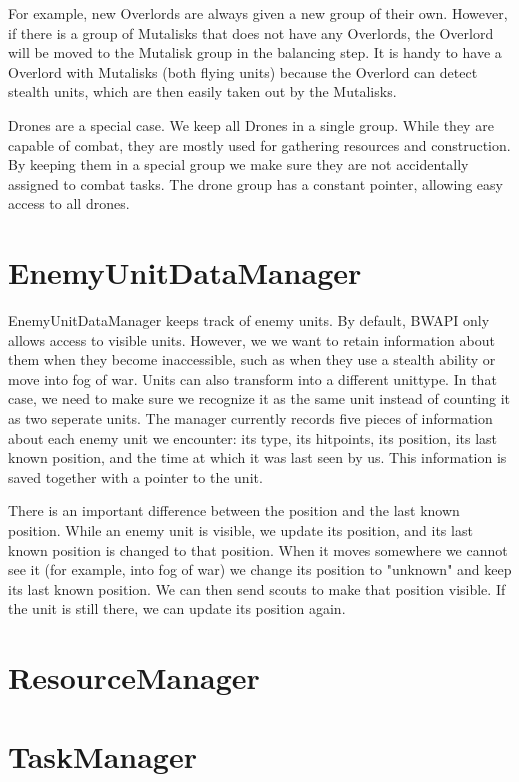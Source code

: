 For example, new Overlords are always given a new group of their own. However, if there is a group of Mutalisks that does not have any Overlords, the Overlord will be moved to the Mutalisk group in the balancing step. It is handy to have a Overlord with Mutalisks (both flying units) because the Overlord can detect stealth units, which are then easily taken out by the Mutalisks.

Drones are a special case. We keep all Drones in a single group. While they are capable of combat, they are mostly used for gathering resources and construction. By keeping them in a special group we make sure they are not accidentally assigned to combat tasks. The drone group has a constant pointer, allowing easy access to all drones.

\section{EnemyUnitDataManager}

EnemyUnitDataManager keeps track of enemy units. By default, BWAPI only allows access to visible units. However, we we want to retain information about them when they become inaccessible, such as when they use a stealth ability or move into fog of war. Units can also transform into a different unittype. In that case, we need to make sure we recognize it as the same unit instead of counting it as two seperate units. The manager currently records five pieces of information about each enemy unit we encounter: its type, its hitpoints, its position, its last known position, and the time at which it was last seen by us. This information is saved together with a pointer to the unit.

There is an important difference between the position and the last known position. While an enemy unit is visible, we update its position, and its last known position is changed to that position. When it moves somewhere we cannot see it (for example, into fog of war) we change its position to "unknown" and keep its last known position. We can then send scouts to make that position visible. If the unit is still there, we can update its position again.

\section{ResourceManager}

\section{TaskManager}

